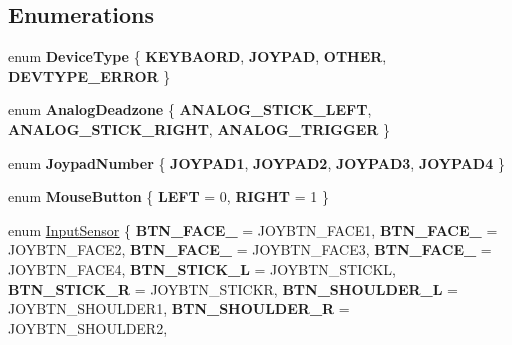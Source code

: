 \subsection*{Enumerations}
\begin{DoxyCompactItemize}
\item 
\mbox{\label{namespace_blade_a4b2643b070de59e7efb19f822b58c3e2}} 
enum {\bfseries Device\+Type} \{ {\bfseries K\+E\+Y\+B\+A\+O\+RD}, 
{\bfseries J\+O\+Y\+P\+AD}, 
{\bfseries O\+T\+H\+ER}, 
{\bfseries D\+E\+V\+T\+Y\+P\+E\+\_\+\+E\+R\+R\+OR}
 \}
\item 
\mbox{\label{namespace_blade_adb8d53ba532ddbcaa1145cd0e90ea044}} 
enum {\bfseries Analog\+Deadzone} \{ {\bfseries A\+N\+A\+L\+O\+G\+\_\+\+S\+T\+I\+C\+K\+\_\+\+L\+E\+FT}, 
{\bfseries A\+N\+A\+L\+O\+G\+\_\+\+S\+T\+I\+C\+K\+\_\+\+R\+I\+G\+HT}, 
{\bfseries A\+N\+A\+L\+O\+G\+\_\+\+T\+R\+I\+G\+G\+ER}
 \}
\item 
\mbox{\label{namespace_blade_a753f8267ca1993620f0dc38c4337129c}} 
enum {\bfseries Joypad\+Number} \{ {\bfseries J\+O\+Y\+P\+A\+D1}, 
{\bfseries J\+O\+Y\+P\+A\+D2}, 
{\bfseries J\+O\+Y\+P\+A\+D3}, 
{\bfseries J\+O\+Y\+P\+A\+D4}
 \}
\item 
\mbox{\label{namespace_blade_abae6e4a03fc5f7056462625f0af3856c}} 
enum {\bfseries Mouse\+Button} \{ {\bfseries L\+E\+FT} = 0, 
{\bfseries R\+I\+G\+HT} = 1
 \}
\item 
enum \hyperlink{namespace_blade_a1ecca198b7e0afbe43139ec2b0db937c}{Input\+Sensor} \{ \newline
{\bfseries B\+T\+N\+\_\+\+F\+A\+C\+E\+\_} = J\+O\+Y\+B\+T\+N\+\_\+\+F\+A\+C\+E1, 
{\bfseries B\+T\+N\+\_\+\+F\+A\+C\+E\+\_} = J\+O\+Y\+B\+T\+N\+\_\+\+F\+A\+C\+E2, 
{\bfseries B\+T\+N\+\_\+\+F\+A\+C\+E\+\_} = J\+O\+Y\+B\+T\+N\+\_\+\+F\+A\+C\+E3, 
{\bfseries B\+T\+N\+\_\+\+F\+A\+C\+E\+\_} = J\+O\+Y\+B\+T\+N\+\_\+\+F\+A\+C\+E4, 
\newline
{\bfseries B\+T\+N\+\_\+\+S\+T\+I\+C\+K\+\_\+L} = J\+O\+Y\+B\+T\+N\+\_\+\+S\+T\+I\+C\+KL, 
{\bfseries B\+T\+N\+\_\+\+S\+T\+I\+C\+K\+\_\+R} = J\+O\+Y\+B\+T\+N\+\_\+\+S\+T\+I\+C\+KR, 
{\bfseries B\+T\+N\+\_\+\+S\+H\+O\+U\+L\+D\+E\+R\+\_\+L} = J\+O\+Y\+B\+T\+N\+\_\+\+S\+H\+O\+U\+L\+D\+E\+R1, 
{\bfseries B\+T\+N\+\_\+\+S\+H\+O\+U\+L\+D\+E\+R\+\_\+R} = J\+O\+Y\+B\+T\+N\+\_\+\+S\+H\+O\+U\+L\+D\+E\+R2, 
\newline

\end{DoxyCompactItemize}

